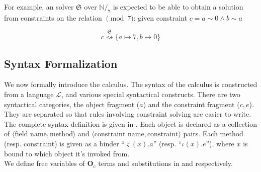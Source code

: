   

For example, an solver $\mathfrak{S}$ over $\mathbb{N}/_{7}$ is expected to
be able to obtain a solution from constraints on the relation $\pmod{7}$: given
constraint $c = a \sim 0 \land b \sim a$

\[
  c \stackrel{\mathfrak{S}}{\rightsquigarrow} \{ a \mapsto 7 , b \mapsto 0\}
\]

\subsection{Syntax Formalization}

We now formally introduce the calculus. The syntax of the calculus is
constructed from a language $\mathcal{L}$, and various special syntactical
constructs. There are two syntactical categories, the object fragment
($a$) and the constraint fragment ($c,e$). They are separated so that rules
involving constraint solving are easier to write.\\

The complete syntax definition is given in . Each object is
declared as a collection of $\langle \text{field name} , \text{method} \rangle$
and $\langle \text{constraint name} , \text{constraint} \rangle$ pairs. Each
method (resp. constraint) is given as a binder ``$\varsigma(x).a$'' (resp.
``$\iota(x).e$''), where $x$ is bound to which object it's invoked from.\\

We define free variables of $\textbf{O}_c$ terms and substitutions in
 and  respectively.

